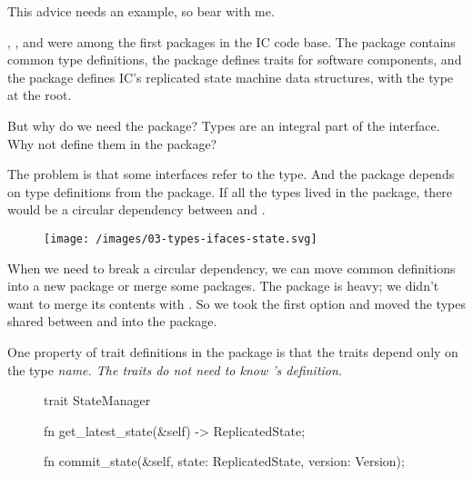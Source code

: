 \documentclass{article}
\begin{document}

This advice needs an example, so bear with me.

, , and  were among the first packages in the IC code base.
The  package contains common type definitions,
the  package defines traits for software components,
and the  package defines IC's replicated state machine data structures,
with the  type at the root.

But why do we need the  package?
Types are an integral part of the interface.
Why not define them in the  package?

The problem is that some interfaces refer to the  type.
And the  package depends on type definitions from the  package.
If all the types lived in the  package, there would be a circular dependency between  and .

\begin{figure}[grayscale-diagram]
  \texttt{[image: /images/03-types-ifaces-state.svg]}
\end{figure}

When we need to break a circular dependency, we can move common definitions into a new package or merge some packages.
The  package is heavy; we didn't want to merge its contents with .
So we took the first option and moved the types shared between  and  into the  package.

One property of trait definitions in the  package is that the traits depend only on the  type \em{name}.
The traits do not need to know 's definition.

\begin{figure}
\begin{code}[good]
trait StateManager {
  fn get_latest_state(&self) -> ReplicatedState;

  fn commit_state(&self, state: ReplicatedState, version: Version);
}
\end{code}
\end{figure}
\end{document}

